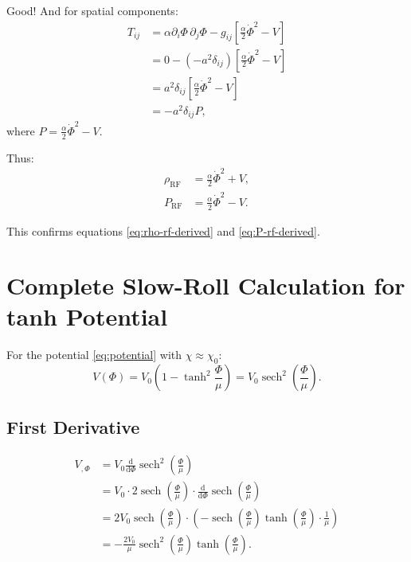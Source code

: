 \documentclass[11pt,a4paper]{article}
\numberwithin{equation}{section}
\theoremstyle{plain}
\theoremstyle{definition}
\theoremstyle{remark}
\newcommand{\dd}{\mathrm{d}}
\begin{document}
Good! And for spatial components:
\begin{align}
T_{ij} &= \alpha\partial_i\Phi\,\partial_j\Phi - g_{ij}\left[\frac{\alpha}{2}\dot{\Phi}^2 - V\right]\\
&= 0 - (-a^2\delta_{ij})\left[\frac{\alpha}{2}\dot{\Phi}^2 - V\right]\\
&= a^2\delta_{ij}\left[\frac{\alpha}{2}\dot{\Phi}^2 - V\right]\\
&= -a^2\delta_{ij}P,
\end{align}
where $P = \frac{\alpha}{2}\dot{\Phi}^2 - V$.

Thus:
\begin{align}
\rho_{\mathrm{RF}} &= \frac{\alpha}{2}\dot{\Phi}^2 + V,\\
P_{\mathrm{RF}} &= \frac{\alpha}{2}\dot{\Phi}^2 - V.
\end{align}

This confirms equations \eqref{eq:rho-rf-derived} and \eqref{eq:P-rf-derived}.

\section{Complete Slow-Roll Calculation for tanh Potential}
\label{app:slowroll}

For the potential \eqref{eq:potential} with $\chi \approx \chi_0$:
\begin{equation}
V(\Phi) = V_0\left(1 - \tanh^2\frac{\Phi}{\mu}\right) = V_0\operatorname{sech}^2\left(\frac{\Phi}{\mu}\right).
\end{equation}

\subsection{First Derivative}

\begin{align}
V_{,\Phi} &= V_0\frac{\dd}{\dd\Phi}\operatorname{sech}^2\left(\frac{\Phi}{\mu}\right)\\
&= V_0 \cdot 2\operatorname{sech}\left(\frac{\Phi}{\mu}\right)\cdot\frac{\dd}{\dd\Phi}\operatorname{sech}\left(\frac{\Phi}{\mu}\right)\\
&= 2V_0\operatorname{sech}\left(\frac{\Phi}{\mu}\right)\cdot\left(-\operatorname{sech}\left(\frac{\Phi}{\mu}\right)\tanh\left(\frac{\Phi}{\mu}\right)\cdot\frac{1}{\mu}\right)\\
&= -\frac{2V_0}{\mu}\operatorname{sech}^2\left(\frac{\Phi}{\mu}\right)\tanh\left(\frac{\Phi}{\mu}\right).
\end{align}
\end{document}
